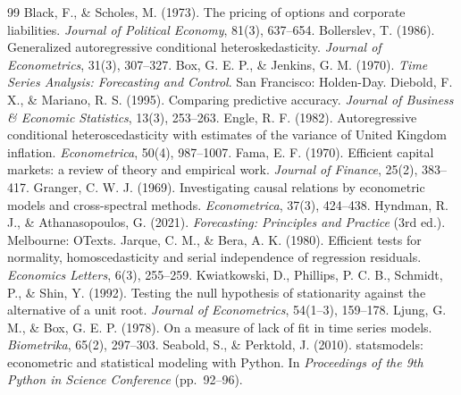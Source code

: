 \documentclass[12pt,a4paper]{article}
\begin{document}
\clearpage
{}
{}
\begin{thebibliography}{99}
 Black, F., \& Scholes, M. (1973). The pricing of options and corporate liabilities. \textit{Journal of Political Economy}, 81(3), 637--654.
 Bollerslev, T. (1986). Generalized autoregressive conditional heteroskedasticity. \textit{Journal of Econometrics}, 31(3), 307--327.
 Box, G. E. P., \& Jenkins, G. M. (1970). \textit{Time Series Analysis: Forecasting and Control}. San Francisco: Holden-Day.
 Diebold, F. X., \& Mariano, R. S. (1995). Comparing predictive accuracy. \textit{Journal of Business \& Economic Statistics}, 13(3), 253--263.
 Engle, R. F. (1982). Autoregressive conditional heteroscedasticity with estimates of the variance of United Kingdom inflation. \textit{Econometrica}, 50(4), 987--1007.
 Fama, E. F. (1970). Efficient capital markets: a review of theory and empirical work. \textit{Journal of Finance}, 25(2), 383--417.
 Granger, C. W. J. (1969). Investigating causal relations by econometric models and cross-spectral methods. \textit{Econometrica}, 37(3), 424--438.
 Hyndman, R. J., \& Athanasopoulos, G. (2021). \textit{Forecasting: Principles and Practice} (3rd ed.). Melbourne: OTexts.
 Jarque, C. M., \& Bera, A. K. (1980). Efficient tests for normality, homoscedasticity and serial independence of regression residuals. \textit{Economics Letters}, 6(3), 255--259.
 Kwiatkowski, D., Phillips, P. C. B., Schmidt, P., \& Shin, Y. (1992). Testing the null hypothesis of stationarity against the alternative of a unit root. \textit{Journal of Econometrics}, 54(1--3), 159--178.
 Ljung, G. M., \& Box, G. E. P. (1978). On a measure of lack of fit in time series models. \textit{Biometrika}, 65(2), 297--303.
 Seabold, S., \& Perktold, J. (2010). statsmodels: econometric and statistical modeling with Python. In \textit{Proceedings of the 9th Python in Science Conference} (pp.\ 92--96).
\end{thebibliography}
\end{document}
